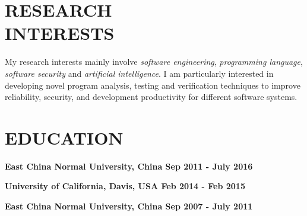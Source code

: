 \documentclass[margin]{res}
\begin{document}
\begin{resume}

\section{RESEARCH\\INTERESTS}
{My research interests mainly involve \emph{software engineering}, \emph{programming language}, \emph{software security} and \emph{artificial intelligence}. I am particularly interested in developing novel program analysis, testing and verification techniques to improve reliability, security, and development productivity for different software systems.}


\section{EDUCATION}
\textbf{East China Normal University, China \hfill{Sep 2011 - July 2016}\\}

\textbf{University of California, Davis, USA \hfill{Feb 2014 - Feb 2015}\\}

\textbf{East China Normal University, China \hfill{Sep 2007 - July 2011}\\}


\end{resume}
\end{document}

